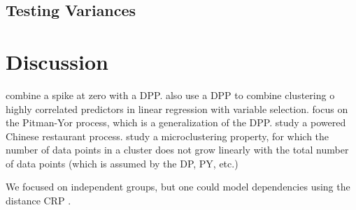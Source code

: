 \documentclass[11pt,a4paper]{article}
\theoremstyle{definition} %
\theoremstyle{case}
\begin{document}
\subsection{Testing Variances}

\section{Discussion} \label{sec:discussion}
\textcite{kim2009spiked} combine a spike at zero with a DPP. \textcite{curtis2011bayesian} also use a DPP to combine clustering o highly correlated predictors in linear regression with variable selection. \textcite{canale2017pitman} focus on the Pitman-Yor process, which is a generalization of the DPP. \textcite{lu2018reducing} study a powered Chinese restaurant process. \textcite{miller2015microclustering} study a microclustering property, for which the number of data points in a cluster does not grow linearly with the total number of data points (which is assumed by the DP, PY, etc.)

We focused on independent groups, but one could model dependencies using the distance CRP \parencite{blei2011distance}.


\printbibliography
\end{document}
